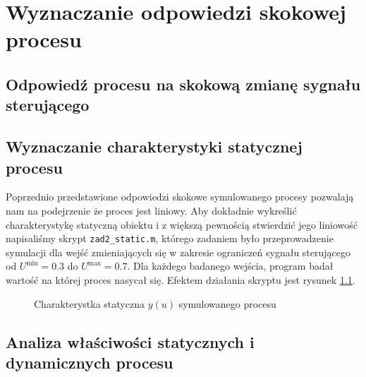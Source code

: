 \chapter{Wyznaczanie odpowiedzi skokowej procesu}
\label{zad2}

\section{Odpowiedź procesu na skokową zmianę sygnału sterującego}
\label{zad2_skoki}



\section{Wyznaczanie charakterystyki statycznej procesu}
\label{zad2_char_stat}
Poprzednio przedstawione odpowiedzi skokowe symulowanego procesy pozwalają nam
na podejrzenie że proces jest liniowy. Aby dokładnie wykreślić charakterystykę statyczną 
obiektu i z większą pewnością stwierdzić jego liniowość napisaliśmy skrypt \verb+zad2_static.m+,
którego zadaniem było przeprowadzenie symulacji dla wejść zmieniających się w zakresie ograniczeń
sygnału sterującego od $U^{\mathrm{min}} = \num{0.3}$ do $U^{\mathrm{max}} = \num{0.7}$. Dla każdego 
badanego wejścia, program badał wartość na której proces nasycał się. Efektem działania skryptu
jest rysunek \ref{zad2_stat_wykres}. 

\begin{figure}[b]
    \centering
    \caption{Charakterystka statyczna $y(u)$ symulowanego procesu}
    \label{zad2_stat_wykres}
\end{figure}

\section{Analiza właściwości statycznych i dynamicznych procesu}
